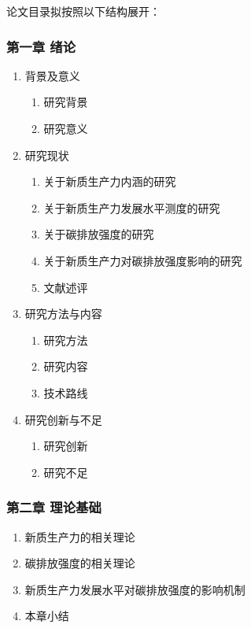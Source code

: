 \documentclass[UTF8,a4paper,zihao=-4,fontset=windows]{ctexart}
\begin{document}
论文目录拟按照以下结构展开：

\subsubsection*{第一章 绪论}
\begin{enumerate}[label=1.\arabic*]
  \item 背景及意义
  \begin{enumerate}[label=1.1.\arabic*]
    \item 研究背景
    \item 研究意义
  \end{enumerate}
  \item 研究现状
  \begin{enumerate}[label=1.2.\arabic*]
    \item 关于新质生产力内涵的研究
    \item 关于新质生产力发展水平测度的研究
    \item 关于碳排放强度的研究
    \item 关于新质生产力对碳排放强度影响的研究
    \item 文献述评
  \end{enumerate}
  \item 研究方法与内容
  \begin{enumerate}[label=1.3.\arabic*]
    \item 研究方法
    \item 研究内容
    \item 技术路线
  \end{enumerate}
  \item 研究创新与不足
  \begin{enumerate}[label=1.4.\arabic*]
    \item 研究创新
    \item 研究不足
  \end{enumerate}
\end{enumerate}

\subsubsection*{第二章 理论基础}
\begin{enumerate}[label=2.\arabic*]
  \item 新质生产力的相关理论
  \item 碳排放强度的相关理论
  \item 新质生产力发展水平对碳排放强度的影响机制
  \item 本章小结
\end{enumerate}
\end{document}
